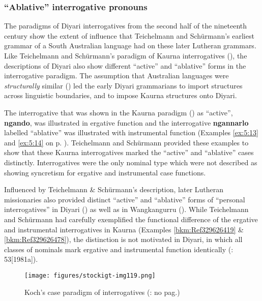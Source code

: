 \subsubsection{“Ablative” interrogative pronouns}
\label{sec:key:8.5.2.4}\label{bkm:Ref457382604}

The paradigms of Diyari interrogatives from the second half of the nineteenth century show the extent of influence that Teichelmann and Schürmann’s earliest grammar of a South Australian language had on these later Lutheran grammars. Like Teichelmann and Schürmann’s paradigm of Kaurna interrogatives (), the descriptions of Diyari also show different “active” and “ablative” forms in the interrogative paradigm. The assumption that Australian languages were \textit{structurally} similar () led the early Diyari grammarians to import structures across linguistic boundaries, and to impose Kaurna structures onto Diyari.

The interrogative that was shown in the Kaurna paradigm () as “active'', \textbf{ngando}, was illustrated in ergative function and the interrogative \textbf{ngannarlo} labelled “ablative'' was illustrated with instrumental function (Examples \ref{ex:5:13} and \ref{ex:5:14} on p. \pageref{ex:5:14}). Teichelmann and Schürmann provided these examples to show that these Kaurna interrogatives marked the “active” and ``ablative” cases distinctly. Interrogatives were the only nominal type which were not described as showing syncretism for ergative and instrumental case functions.

Influenced by Teichelmann \& Schürmann’s description, later Lutheran missionaries also provided distinct “active” and “ablative” forms of “personal interrogatives” in Diyari () as well as in Wangkangurru (). While Teichelmann and Schürmann had carefully exemplified the functional difference of the ergative and instrumental interrogatives in Kaurna (Examples \ref{bkm:Ref329626419}  \& \ref{bkm:Ref329626478}), the distinction is not motivated in Diyari, in which all classes of nominals mark ergative and instrumental function identically (\citeyear{austin_grammar_2013}: 53[1981a]).


\begin{figure}
\texttt{[image: figures/stockigt-img119.png]}
\caption{Koch’s case paradigm of interrogatives (\citeyear{koch_untitled_1868}: no pag.)}
\label{bkm:Ref449368926}\label{fig:key:8-170}
\end{figure}

